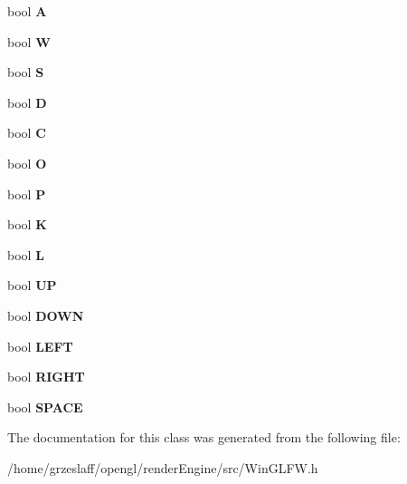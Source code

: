 \begin{DoxyCompactItemize}
\item 
\hypertarget{classKeys_a08cbd5121b4f4b523c6c922cc418d965}{bool {\bfseries A}}\label{classKeys_a08cbd5121b4f4b523c6c922cc418d965}

\item 
\hypertarget{classKeys_a6c6c26bf366be563d11ef98db769c1cf}{bool {\bfseries W}}\label{classKeys_a6c6c26bf366be563d11ef98db769c1cf}

\item 
\hypertarget{classKeys_a3d34ae8364dc71e388060bf317426444}{bool {\bfseries S}}\label{classKeys_a3d34ae8364dc71e388060bf317426444}

\item 
\hypertarget{classKeys_a934cb7ebcc2bffaada81243b031fc27f}{bool {\bfseries D}}\label{classKeys_a934cb7ebcc2bffaada81243b031fc27f}

\item 
\hypertarget{classKeys_a18e4a36e21c22511e1023687e2f0d173}{bool {\bfseries C}}\label{classKeys_a18e4a36e21c22511e1023687e2f0d173}

\item 
\hypertarget{classKeys_aee01d00aa2bb7e19cd815b8309ff0d06}{bool {\bfseries O}}\label{classKeys_aee01d00aa2bb7e19cd815b8309ff0d06}

\item 
\hypertarget{classKeys_abd8cf6ada93b4e4f3ddad959147a1cd1}{bool {\bfseries P}}\label{classKeys_abd8cf6ada93b4e4f3ddad959147a1cd1}

\item 
\hypertarget{classKeys_a213627045ecacd2393a65de9d6e76b59}{bool {\bfseries K}}\label{classKeys_a213627045ecacd2393a65de9d6e76b59}

\item 
\hypertarget{classKeys_a9843eb1521e406e450a9e6594a6af118}{bool {\bfseries L}}\label{classKeys_a9843eb1521e406e450a9e6594a6af118}

\item 
\hypertarget{classKeys_a97823b4d1ad00ebfa84d69db5df53b54}{bool {\bfseries U\-P}}\label{classKeys_a97823b4d1ad00ebfa84d69db5df53b54}

\item 
\hypertarget{classKeys_adc7e7e5b74e1330f637512529df8dfc5}{bool {\bfseries D\-O\-W\-N}}\label{classKeys_adc7e7e5b74e1330f637512529df8dfc5}

\item 
\hypertarget{classKeys_a8ee828b0025d2eac14ad2216ea4afdf1}{bool {\bfseries L\-E\-F\-T}}\label{classKeys_a8ee828b0025d2eac14ad2216ea4afdf1}

\item 
\hypertarget{classKeys_a5c5de2f81a1cc2e9083ee3e4f6785783}{bool {\bfseries R\-I\-G\-H\-T}}\label{classKeys_a5c5de2f81a1cc2e9083ee3e4f6785783}

\item 
\hypertarget{classKeys_ae70915083fb1fe83f5facf20db305d59}{bool {\bfseries S\-P\-A\-C\-E}}\label{classKeys_ae70915083fb1fe83f5facf20db305d59}

\end{DoxyCompactItemize}


The documentation for this class was generated from the following file\-:\begin{DoxyCompactItemize}
\item 
/home/grzeslaff/opengl/render\-Engine/src/Win\-G\-L\-F\-W.\-h\end{DoxyCompactItemize}
